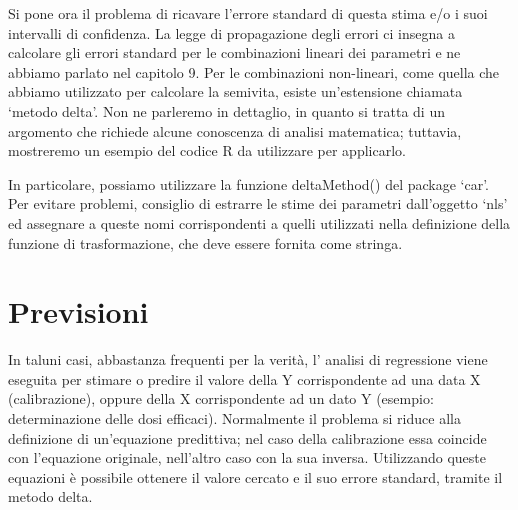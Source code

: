 \documentclass[a4paper,12pt,oneside]{book}
\newenvironment{Shaded}{}{}
\newcommand{\KeywordTok}[1]{#1}
\newcommand{\DataTypeTok}[1]{#1}
\newcommand{\StringTok}[1]{#1}
\newcommand{\CommentTok}[1]{#1}
\newcommand{\NormalTok}[1]{#1}
\begin{document}
Si pone ora il problema di ricavare l'errore standard di questa stima e/o i suoi intervalli di confidenza. La legge di propagazione degli errori ci insegna a calcolare gli errori standard per le combinazioni lineari dei parametri e ne abbiamo parlato nel capitolo 9. Per le combinazioni non-lineari, come quella che abbiamo utilizzato per calcolare la semivita, esiste un'estensione chiamata `metodo delta'. Non ne parleremo in dettaglio, in quanto si tratta di un argomento che richiede alcune conoscenza di analisi matematica; tuttavia, mostreremo un esempio del codice R da utilizzare per applicarlo.

In particolare, possiamo utilizzare la funzione deltaMethod() del package `car'. Per evitare problemi, consiglio di estrarre le stime dei parametri dall'oggetto `nls' ed assegnare a queste nomi corrispondenti a quelli utilizzati nella definizione della funzione di trasformazione, che deve essere fornita come stringa.

\begin{Shaded}
\end{Shaded}

\hypertarget{previsioni-1}{%
\section{Previsioni}\label{previsioni-1}}

In taluni casi, abbastanza frequenti per la verità, l' analisi di regressione viene eseguita per stimare o predire il valore della Y corrispondente ad una data X (calibrazione), oppure della X corrispondente ad un dato Y (esempio: determinazione delle dosi efficaci). Normalmente il problema si riduce alla definizione di un'equazione predittiva; nel caso della calibrazione essa coincide con l'equazione originale, nell'altro caso con la sua inversa. Utilizzando queste equazioni è possibile ottenere il valore cercato e il suo errore standard, tramite il metodo delta.
\end{document}
